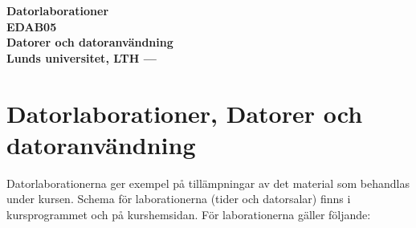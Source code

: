 \documentclass[fleqn, article, a4paper]{memoir}
\author{}
\begin{document}
\clearpage
\thispagestyle{empty} %
\vspace*{30mm}
\begin{center}
	\sffamily
	\renewcommand{\baselinestretch}{1.1}
	\Huge\bfseries Datorlaborationer \\[5mm]
	EDAB05 \\[2mm]
	\LARGE\bfseries	Datorer och datoranvändning \\[7mm]
	\large Lunds universitet, LTH --- \the\year
\end{center}
\clearpage


\maketitle
\thispagestyle{titlepage}
\vspace{-4cm}
\section*{Datorlaborationer, Datorer och datoranvändning}

Datorlaborationerna ger exempel på tillämpningar av det material som behandlas under kursen. Schema för laborationerna (tider och datorsalar) finns i kursprogrammet och på kurshemsidan. För laborationerna gäller följande:
\end{document}
